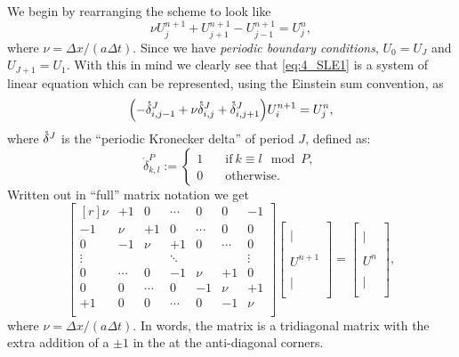 \documentclass[11pt,letter, swedish, english
]{article}
\newcommand{\Dx}{\ensuremath{\Delta{x}}}
\newcommand{\Dt}{\ensuremath{\Delta{t}}}
\begin{document}
We begin by rearranging the scheme to look like
\begin{equation}\label{eq:4_SLE1}
\nu U_j^{n+1}+U_{j+1}^{n+1}-U_{j-1}^{n+1}=U_j^n,
\end{equation}
where $\nu=\Dx/(a\Dt)$. 
Since we have \emph{periodic boundary conditions}\footnotemark{},
$U_0=U_J$ and $U_{J+1}=U_1$. With this in mind we clearly see that
\eqref{eq:4_SLE1} is a system of linear equation which can be
represented, using the Einstein sum convention, as
\begin{equation}
\qty(-{\mathring{\delta}^{J}_{i,j-1}}+\nu{\mathring{\delta}^{J}_{i, j}}+{\mathring{\delta}^{J}_{i, j+1}})U^{n+1}_i=U_j^n,
\end{equation}
where ${\mathring{\delta}^{J}_{}}$ is the ``periodic Kronecker delta'' of period $J$,
defined as:
\begin{equation}
\mathring\delta^{P}_{k,l}:=
\begin{cases}
1\quad&\text{if}\ k\equiv l\mod P,\\
0&\text{otherwise}.
\end{cases}
\end{equation}
Written out in ``full'' matrix notation we get
\begin{equation}
\begin{bmatrix*}[r]
\nu&+1&0&\cdots&0&0&-1\\
-1&\nu&+1&0&\cdots&0&0\\
0&-1&\nu&+1&0&\cdots&0\\
\vdots&&&\ddots&&&\vdots\\
0&\cdots&0&-1&\nu&+1&0\\
0&0&\cdots&0&-1&\nu&+1\\
+1&0&0&\cdots&0&-1&\nu\\
\end{bmatrix*}
\begin{bmatrix*}
{}\\|\;\\{}\\U^{n+1}\\{}\\|\;\\{}
\end{bmatrix*}
=
\begin{bmatrix*}
{}\\|\\{}\\U^{n}\\{}\\|\\{}
\end{bmatrix*},
\end{equation}
where $\nu=\Dx/(a\Dt)$. In words, the matrix is a tridiagonal matrix
with the extra addition of a $\pm1$ in the at the anti-diagonal
corners. 


\end{document}
